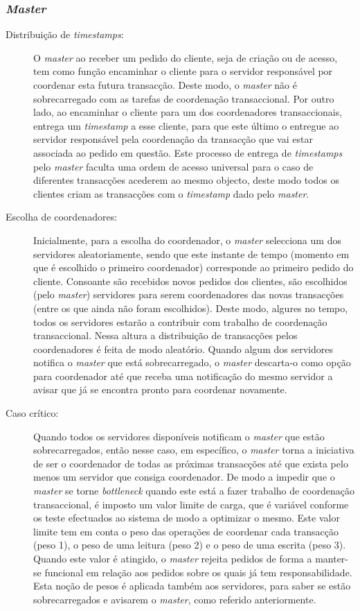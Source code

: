 \subsubsection{\textit{Master}}

\begin{description}

\item[Distribuição de \textit{timestamps}:]
O \textit{\textit{master}} ao receber um pedido do cliente, seja de criação ou de acesso, tem como função encaminhar o cliente para o servidor responsável por coordenar esta futura transacção. Deste modo, o \textit{master} não é sobrecarregado com as tarefas de coordenação transaccional. Por outro lado, ao encaminhar o cliente para um dos coordenadores transaccionais, entrega um \textit{timestamp} a esse cliente, para que este último o entregue ao servidor responsável pela coordenação da transacção que vai estar associada ao pedido em questão. Este processo de entrega de \textit{timestamps} pelo \textit{master} faculta uma ordem de acesso universal para o caso de diferentes transacções acederem ao mesmo objecto, deste modo todos os clientes criam as transacções com o \textit{timestamp} dado pelo \textit{master}.

\item[Escolha de coordenadores:]
Inicialmente, para a escolha do coordenador, o \textit{master} selecciona um dos servidores aleatoriamente, sendo que este instante de tempo (momento em que é escolhido o primeiro coordenador) corresponde ao primeiro pedido do cliente. Consoante são recebidos novos pedidos dos clientes, são escolhidos (pelo \textit{master}) servidores para serem coordenadores das novas transacções (entre os que ainda não foram escolhidos). Deste modo, algures no tempo, todos os servidores estarão a contribuir com trabalho de coordenação transaccional. Nessa altura a distribuição de transacções pelos coordenadores é feita de modo aleatório. Quando algum dos servidores notifica o \textit{master} que está  sobrecarregado, o \textit{master} descarta-o como opção para coordenador até que receba uma notificação do mesmo servidor a avisar que já se encontra pronto para coordenar novamente.

\item[Caso crítico:]
Quando todos os servidores disponíveis notificam o \textit{master} que estão sobrecarregados, então nesse caso, em específico, o \textit{master} torna a iniciativa de ser o coordenador de todas as próximas transacções até que exista pelo menos um servidor que consiga coordenador. De modo a impedir que o \textit{master} se torne \textit{bottleneck} quando este está a fazer trabalho de coordenação transaccional, é imposto um valor limite de carga, que é variável conforme os teste efectuados ao sistema de modo a optimizar o mesmo. Este valor limite tem em conta o peso das operações de coordenar cada transacção (peso 1), o peso de uma leitura (peso 2) e o peso de uma escrita (peso 3). Quando este valor é atingido, o \textit{master} rejeita pedidos de forma a manter-se funcional em relação aos pedidos sobre os quais já tem responsabilidade. Esta noção de pesos é aplicada também aos servidores, para saber se estão sobrecarregados e avisarem o \textit{master}, como referido anteriormente.


\end{description}
